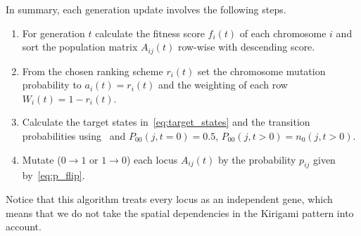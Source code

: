 In summary, each generation update involves the following steps.
\begin{enumerate}
  \item For generation $t$ calculate the fitness score $f_i(t)$ of each chromosome $i$ and sort the population matrix $A_{ij}(t)$ row-wise with descending score. 
  \item From the chosen ranking scheme $r_i(t)$ set the chromosome mutation probability to $a_i(t) = r_i(t)$ and the weighting of each row $W_i(t) = 1 - r_i(t)$.
  \item Calculate the target states in~\cref{eq:target_states} and the transition probabilities using~ and $P_{00}(j, t = 0) = 0.5$, $P_{00}(j,t>0) = n_0(j,t>0)$.
  \item Mutate ($0\to1$ or $1\to0$) each locus $A_{ij}(t)$ by the probability $p_{ij}$ given by~\cref{eq:p_flip}.
\end{enumerate}
Notice that this algorithm treats every locus as an independent gene, which means that we do not take the spatial dependencies in the Kirigami pattern into account.


